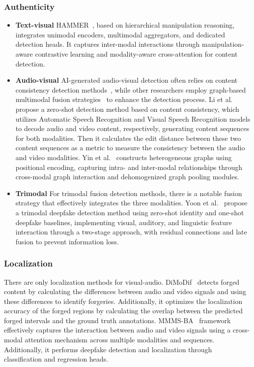 \subsubsection{\textbf{Authenticity}}
\begin{itemize}
    \item \textbf{Text-visual}
    HAMMER~\cite{Shao2023CVPR}, based on hierarchical manipulation reasoning, integrates unimodal encoders, multimodal aggregators, and dedicated detection heads. It captures inter-modal interactions through manipulation-aware contrastive learning and modality-aware cross-attention for content detection. 
    
    \item \textbf{Audio-visual}
    AI-generated audio-visual detection often relies on content consistency detection methods~\cite{li2024zero}, while other researchers employ graph-based multimodal fusion strategies~\cite{yin2024fine} to enhance the detection process.
    Li et al.~\cite{li2024zero} propose a zero-shot detection method based on content consistency, which utilizes Automatic Speech Recognition and Visual Speech Recognition models to decode audio and video content, respectively, generating content sequences for both modalities. Then it calculates the edit distance between these two content sequences as a metric to measure the consistency between the audio and video modalities.
    Yin et al.~\cite{yin2024fine} constructs heterogeneous graphs using positional encoding, capturing intra- and inter-modal relationships through cross-modal graph interaction and dehomogenized graph pooling modules. 

    \item \textbf{Trimodal}
    For trimodal fusion detection methods, there is a notable fusion strategy that effectively integrates the three modalities.
    Yoon et al.~\cite{yoon2024triple} propose a trimodal deepfake detection method using zero-shot identity and one-shot deepfake baselines, implementing visual, auditory, and linguistic feature interaction through a two-stage approach, with residual connections and late fusion to prevent information loss.
    
\end{itemize}

\subsubsection{\textbf{Localization}}
There are only localization methods for visual-audio.
DiMoDif~\cite{koutlis2024dimodif} detects forged content by calculating the differences between audio and video signals and using these differences to identify forgeries. Additionally, it optimizes the localization accuracy of the forged regions by calculating the overlap between the predicted forged intervals and the ground truth annotations.
MMMS-BA~\cite{katamneni2024contextual} framework effectively captures the interaction between audio and video signals using a cross-modal attention mechanism across multiple modalities and sequences. Additionally, it performs deepfake detection and localization through classification and regression heads.